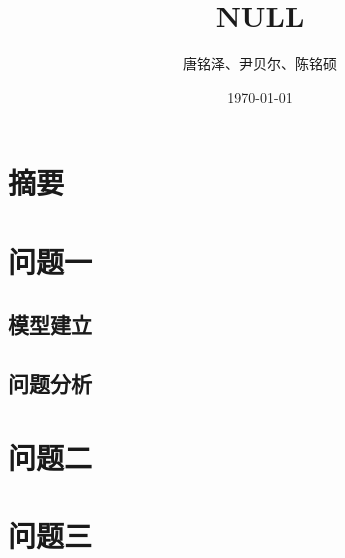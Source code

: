 \documentclass[UTF8]{ctexart}
\title{NULL}
\author{唐铭泽、尹贝尔、陈铭硕}
\date{\today}
\begin{document}
\maketitle
\section{摘要}
\section{问题一}

\subsection{模型建立}

\subsection{问题分析}

\section{问题二}
\section{问题三}
\end{document}
